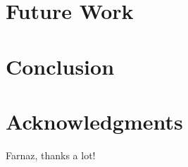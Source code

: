 \documentclass{sigchi}
\begin{document}
\section{Future Work}

\section{Conclusion}

\section{Acknowledgments}
Farnaz, thanks a lot!

%
%
%
%
%
\balance



\end{document}
